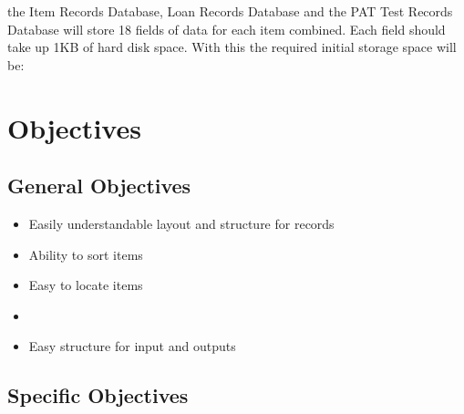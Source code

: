 \documentclass[a4paper,12pt]{report}
\begin{document}
the Item Records Database, Loan Records Database and the PAT Test Records Database will store 18 fields of data for each item combined. Each field should take up 1KB of hard disk space. With this the required initial storage space will be:




\section{Objectives}

\subsection{General Objectives}

\begin{itemize}
	\item Easily understandable layout and structure for records
	\item Ability to sort items
	\item Easy to locate items
	\item
	\item Easy structure for input and outputs
\end{itemize}

\subsection{Specific Objectives}
\end{document}
